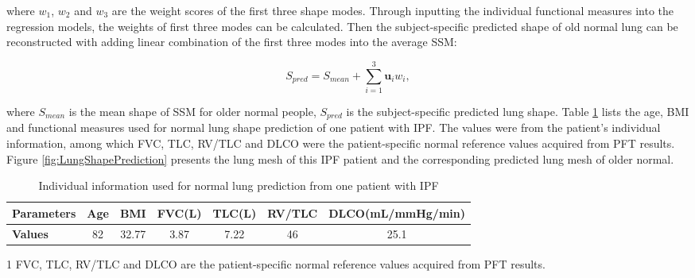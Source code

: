 \noindent where $w_1$, $w_2$ and $w_3$ are the weight scores of the first three shape modes. Through inputting the individual functional measures into the regression models, the weights of first three modes can be calculated. Then the subject-specific predicted shape of old normal lung can be reconstructed with adding linear combination of the first three modes into the average SSM:

\begin{equation}
 \label{eq:NormalLungPrediction}
 S_{pred} = S_{mean} + \sum_{i=1}^3 \mathbf{u}_i w_{i},
\end{equation}

\noindent where $S_{mean}$ is the mean shape of SSM for older normal people, $S_{pred}$ is the subject-specific predicted lung shape. Table \ref{tab:PatientIndividualData} lists the age, BMI and functional measures used for normal lung shape prediction of one patient with IPF. The values were from the patient's individual information, among which FVC, TLC, RV/TLC and DLCO were the patient-specific normal reference values acquired from PFT results. Figure \ref{fig:LungShapePrediction} presents the lung mesh of this IPF patient and the corresponding predicted lung mesh of older normal. 

\begin{table}[h]
\centering
\caption{Individual information used for normal lung prediction from one patient with IPF}
\label{tab:PatientIndividualData}
\begin{tabular}{| l | c | c| c | c| c | c|}
\hline
\bf{Parameters} & \bf{Age} & \bf{BMI} & \bf{FVC(L)} & \bf{TLC(L)} & \bf{RV/TLC} & \bf{DLCO(mL/mmHg/min)}\\
\hline 
\bf{Values} & 82 & 32.77 & 3.87 & 7.22 & 46 & 25.1\\
\hline
\end{tabular}
\begin{tablenotes}
  \item[1] FVC, TLC, RV/TLC and DLCO are the patient-specific normal reference values acquired from PFT results.
\end{tablenotes}
\end{table}

